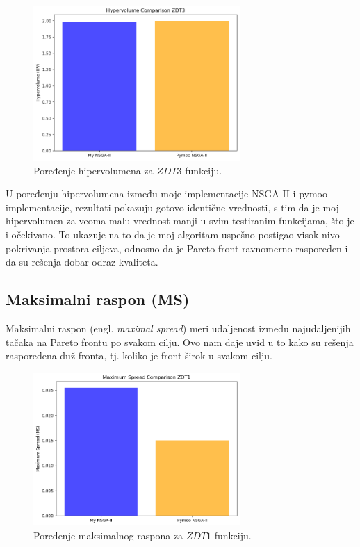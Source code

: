 \documentclass[12pt]{article}
\begin{document}
\begin{figure}[H]
    \centering
    \includegraphics[width=0.7\textwidth]{images/hv_zdt3.png}
    \caption{Poređenje hipervolumena za \( ZDT3 \) funkciju.}
    \label{fig:hv_zdt3}
\end{figure}

U poređenju hipervolumena između moje implementacije NSGA-II i pymoo implementacije, rezultati pokazuju gotovo identične vrednosti, s tim da je moj hipervolumen za veoma malu vrednost manji u svim testiranim funkcijama, što je i očekivano. To ukazuje na to da je moj algoritam uspešno postigao visok nivo pokrivanja prostora ciljeva, odnosno da je Pareto front ravnomerno raspoređen i da su rešenja dobar odraz kvaliteta.

\subsection{Maksimalni raspon (MS)}
Maksimalni raspon (engl. \textit{maximal spread}) meri udaljenost između najudaljenijih tačaka na Pareto frontu po svakom cilju. Ovo nam daje uvid u to kako su rešenja raspoređena duž fronta, tj. koliko je front širok u svakom cilju.

\begin{figure}[H]
    \centering
    \includegraphics[width=0.7\textwidth]{images/ms_zdt1.png}
    \caption{Poređenje maksimalnog raspona za \( ZDT1 \) funkciju.}
    \label{fig:ms_zdt1}
\end{figure}
\end{document}
